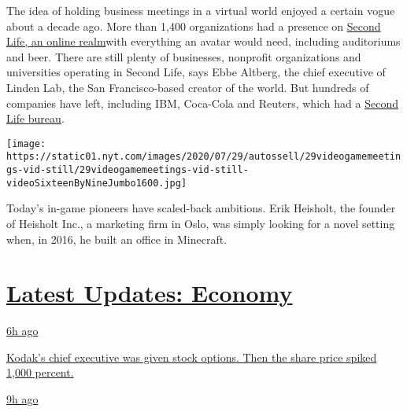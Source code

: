 The idea of holding business meetings in a virtual world enjoyed a
certain vogue about a decade ago. More than 1,400 organizations had a
presence on
\href{https://www.nytimes.com/2006/10/19/technology/19virtual.html}{Second
Life, an online realm}with everything an avatar would need, including
auditoriums and beer. There are still plenty of businesses, nonprofit
organizations and universities operating in Second Life, says Ebbe
Altberg, the chief executive of Linden Lab, the San Francisco-based
creator of the world. But hundreds of companies have left, including
IBM, Coca-Cola and Reuters, which had a
\href{https://www.nytimes.com/2006/10/16/technology/16reuters.html}{Second
Life bureau}.

\texttt{[image: https://static01.nyt.com/images/2020/07/29/autossell/29videogamemeetings-vid-still/29videogamemeetings-vid-still-videoSixteenByNineJumbo1600.jpg]}

Today's in-game pioneers have scaled-back ambitions. Erik Heisholt, the
founder of Heisholt Inc., a marketing firm in Oslo, was simply looking
for a novel setting when, in 2016, he built an office in Minecraft.

\hypertarget{latest-updates-economy}{%
\section{\texorpdfstring{\href{https://www.nytimes.com/live/2020/07/31/business/stock-market-today-coronavirus?action=click\&pgtype=Article\&state=default\&region=MAIN_CONTENT_1\&context=storylines_live_updates}{Latest
Updates:
Economy}}{Latest Updates: Economy}}\label{latest-updates-economy}}

\href{https://www.nytimes.com/live/2020/07/31/business/stock-market-today-coronavirus?action=click\&pgtype=Article\&state=default\&region=MAIN_CONTENT_1\&context=storylines_live_updates\#kodaks-chief-executive-was-given-stock-options-then-the-share-price-spiked-1000-percent}{6h
ago}

\href{https://www.nytimes.com/live/2020/07/31/business/stock-market-today-coronavirus?action=click\&pgtype=Article\&state=default\&region=MAIN_CONTENT_1\&context=storylines_live_updates\#kodaks-chief-executive-was-given-stock-options-then-the-share-price-spiked-1000-percent}{Kodak's
chief executive was given stock options. Then the share price spiked
1,000 percent.}

\href{https://www.nytimes.com/live/2020/07/31/business/stock-market-today-coronavirus?action=click\&pgtype=Article\&state=default\&region=MAIN_CONTENT_1\&context=storylines_live_updates\#fitch-ratings-downgrades-its-outlook-on-us-debt}{9h
ago}

